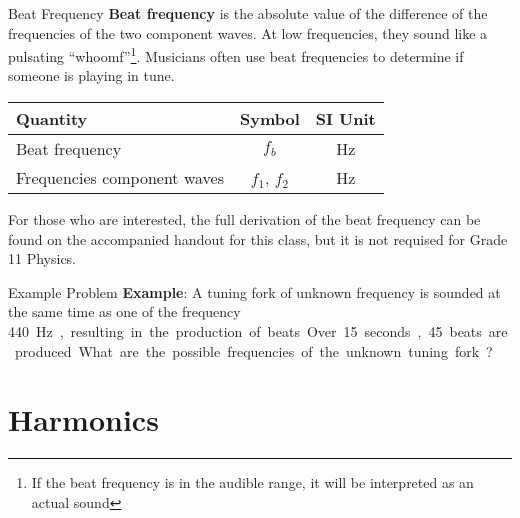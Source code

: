 \documentclass[12pt,compress,aspectratio=169]{beamer}
\begin{document}
\begin{frame}{Beat Frequency}
  \textbf{Beat frequency} is the absolute value of the difference of the
  frequencies of the two component waves. At low frequencies, they sound like a
  pulsating ``whoomf''\footnote{If the beat frequency is in the audible
    range, it will be interpreted as an actual sound}. Musicians often use beat
  frequencies to determine if someone is playing in tune.


  \vspace{-.1in}
  \begin{center}
    \begin{tabular}{l|c|c}
      \rowcolor{pink}
      \textbf{Quantity} & \textbf{Symbol} & \textbf{SI Unit} \\ \hline
      Beat frequency              & $f_b$ & \si\hertz \\
      Frequencies component waves & $f_1$, $f_2$ & \si\hertz
    \end{tabular}
  \end{center}
  For those who are interested, the full derivation of the beat frequency can
  be found on the accompanied handout for this class, but it is not requised
  for Grade 11 Physics.
\end{frame}



\begin{frame}{Example Problem}
  \textbf{Example}: A tuning fork of unknown frequency is sounded at the same
  time as one of the frequency \SI{440}\hertz, resulting in the production of
  beats. Over 15 seconds, 45 beats are produced. What are the possible
  frequencies of the unknown tuning fork?
\end{frame}



\section{Harmonics}
\end{document}

